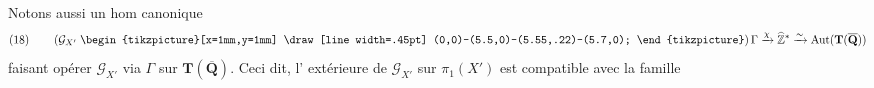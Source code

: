 Notons aussi un hom canonique
\[
(18)\qquad
\left(\mathcal G_{X'}
\mathrel{\vcenter{\hbox{\begin{tikzpicture}[x=1mm,y=1mm]
\draw[line width=.45pt] (0,0)--(5.5,0)--(5.55,.22)--(5.7,0);
\end{tikzpicture}}}}\right)
\Gamma\xrightarrow{\chi}\widehat{\mathbb Z}^{*}
\xrightarrow{\sim}\operatorname{Aut}(\mathbf T(\overline{\mathbf Q}))
\]
faisant opérer $\mathcal G_{X'}$ via $\Gamma$ sur $\mathbf T(\overline{\mathbf Q})$.
Ceci dit, l' extérieure de $\mathcal G_{X'}$
sur $\pi_1(X')$ est compatible avec la famille
